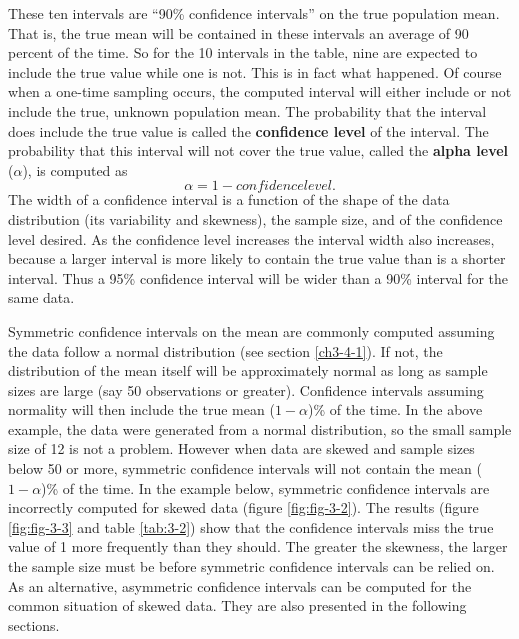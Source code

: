 \documentclass[]{book}
\begin{document}
These ten intervals are ``90\% confidence intervals'' on the true population mean. That is, the true mean will be contained in these intervals an average of 90 percent of the time. So for the 10 intervals in the table, nine are expected to include the true value while one is not. This is in fact what happened. Of course when a one-time sampling occurs, the computed interval will either include or not include the true, unknown population mean. The probability that the interval does include the true value is called the \textbf{confidence level} of the interval. The probability that this interval will not cover the true value, called the \textbf{alpha level} (\(\alpha\)), is computed as
\begin{equation}
\alpha = 1 - confidence level.
\label{eq:3-1}
\end{equation}
The width of a confidence interval is a function of the shape of the data distribution (its variability and skewness), the sample size, and of the confidence level desired. As the confidence level increases the interval width also increases, because a larger interval is more likely to contain the true value than is a shorter interval. Thus a 95\% confidence interval will be wider than a 90\% interval for the same data.

Symmetric confidence intervals on the mean are commonly computed assuming the data follow a normal distribution (see section \ref{ch3-4-1}). If not, the distribution of the mean itself will be approximately normal as long as sample sizes are large (say 50 observations or greater). Confidence intervals assuming normality will then include the true mean (\(1 − \alpha\))\% of the time. In the above example, the data were generated from a normal distribution, so the small sample size of 12 is not a problem. However when data are skewed and sample sizes below 50 or more, symmetric confidence intervals will not contain the mean (\(1 − \alpha\))\% of the time. In the example below, symmetric confidence intervals are incorrectly computed for skewed data (figure \ref{fig:fig-3-2}). The results (figure \ref{fig:fig-3-3} and table \ref{tab:3-2}) show that the confidence intervals miss the true value of 1 more frequently than they should. The greater the skewness, the larger the sample size must be before symmetric confidence intervals can be relied on. As an alternative, asymmetric confidence intervals can be computed for the common situation of skewed data. They are also presented in the following sections.
\end{document}

